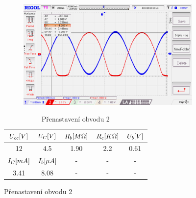 \documentclass{article}
\begin{document}
\vspace{-1mm}
\begin{figure}[H]
	\begin{minipage}[t]{0.6\textwidth}
    \vspace{-13mm}
    \begin{figure}[H]
      \includegraphics[width=\textwidth]{LAB/NewFile6.png}
      \caption{\label{obvod_z_laborky}}
    \end{figure}
  \end{minipage}
  \hfill
	\begin{minipage}[t]{0.35\textwidth}
    \begin{table}[H]
      \vspace{8mm}
      \hspace{-5mm}
      \small
      \begin{tabular}{|c|c|c|c|c|} 
        \hline
        \(U_{cc}\-[V]\) & \(U_{C}\-[V]\)  & \(R_b\-[M\Omega]\) & \(R_c\-[K\Omega]\) & \(U_{b}\-[V]\)  \\ \hline
        12              & 4.5             & 1.90               & 2.2                & 0.61            \\ \hline
        \hline
        \(I_{C}\-[mA]\) & \(I_{b}\-[\mu A]\) & - & - & - \\\hline
        3.41            & 8.08               & - & - & - \\\hline
      \end{tabular}
      \normalsize
      \caption{\label{tab_pracovni_bod_rozladeni1} Přenastavení obvodu 2}
    \end{table}
  \end{minipage}
\end{figure}
\end{document}
